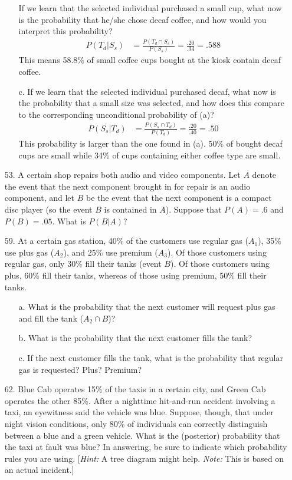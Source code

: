 \documentclass[letterpaper,12pt]{article}
\begin{document}
\begin{enumerate}
\begin{enumerate}
        If we learn that the selected individual purchased a small cup, what now is the probability that he/she chose decaf coffee, and how would you interpret this probability?
        \begin{align*}
          P(T_d|S_s) &= \frac{P(T_d \cap S_s)}{P(S_s)} = \frac{.20}{.34} = .588
        \end{align*}
        This means 58.8\% of small coffee cups bought at the kiosk contain decaf coffee.
      \item[c.]
        If we learn that the selected individual purchased decaf, what now is the probability that a small size was selected, and how does this compare to the corresponding unconditional probability of (a)?
        \begin{align*}
          P(S_s|T_d) &= \frac{P(S_s \cap T_d)}{P(T_d)} = \frac{.20}{.40} = .50
        \end{align*}
        This probability is larger than the one found in (a). 50\% of bought decaf cups are small while 34\% of cups containing either coffee type are small.
    \end{enumerate}
  \item[53.]
    A certain shop repairs both audio and video components. Let $A$ denote the event that the next component brought in for repair is an audio component, and let $B$ be the event that the next component is a compact disc player (so the event $B$ is contained in $A$). Suppose that $P(A) = .6$ and $P(B) = .05$. What is $P(B|A)$?
  \item[59.]
    At a certain gas station, 40\% of the customers use regular gas ($A_1$), 35\% use plus gas ($A_2$), and 25\% use premium ($A_3$). Of those customers using regular gas, only 30\% fill their tanks (event $B$). Of those customers using plus, 60\% fill their tanks, whereas of those using premium, 50\% fill their tanks.
    \begin{enumerate}
      \item[a.]
        What is the probability that the next customer will request plus gas and fill the tank ($A_2 \cap B$)?
      \item[b.]
        What is the probability that the next customer fills the tank?
      \item[c.]
        If the next customer fills the tank, what is the probability that regular gas is requested? Plus? Premium?
    \end{enumerate}
  \item[62.]
    Blue Cab operates 15\% of the taxis in a certain city, and Green Cab operates the other 85\%. After a nighttime hit-and-run accident involving a taxi, an eyewitness said the vehicle was blue. Suppose, though, that under night vision conditions, only 80\% of individuals can correctly distinguish between a blue and a green vehicle. What is the (posterior) probability that the taxi at fault was blue? In answering, be sure to indicate which probability rules you are using. [\textit{Hint:} A tree diagram might help. \textit{Note:} This is based on an actual incident.]
\end{enumerate}
\end{document}
